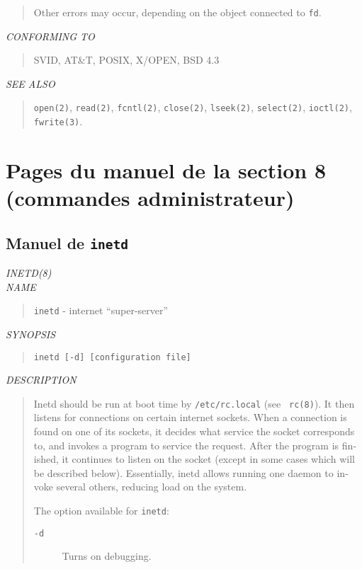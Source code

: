 \begin{appendix}
\begin{english}
\begin{quote}
	Other errors may occur, depending on the object connected to {\tt fd}.
\end{quote}

{\sl CONFORMING TO}
\begin{quote}
	SVID, AT\&T, POSIX, X/OPEN, BSD 4.3
\end{quote}

{\sl SEE ALSO}
\begin{quote}
	{\tt open(2)}, {\tt read(2)}, {\tt fcntl(2)}, {\tt close(2)},
	{\tt lseek(2)}, {\tt select(2)}, {\tt ioctl(2)}, {\tt fwrite(3)}.
\end{quote}
\end{english}

\section{Pages du manuel de la section 8 (commandes administrateur)}

\subsection{Manuel de {\tt inetd}}
\begin{english}
{\sl INETD(8)}\\

{\sl NAME}
\begin{quote}
	{\tt inetd} - internet ``super-server''
\end{quote}

{\sl SYNOPSIS}
\begin{quote}
	{\tt inetd [-d] [configuration file]}
\end{quote}

{\sl DESCRIPTION}
\begin{quote}
	Inetd should be run at boot time by {\tt /etc/rc.local} (see {\tt
	rc(8)}). It then listens for connections on certain internet
	sockets. When a connection is found on one of its sockets, it
	decides what service the socket corresponds to, and invokes a
	program to service the request. After the program is finished, it
	continues to listen on the socket (except in some cases which will
	be described below). Essentially, inetd allows running one daemon
	to invoke several others, reducing load on the system.

	The option available for {\tt inetd}:
	\begin{description}
		\item[{\tt -d}] Turns on debugging.
	\end{description}


\end{quote}
\end{english}
\end{appendix}
